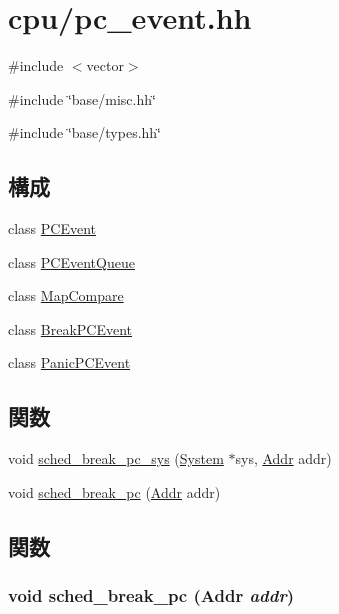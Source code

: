 \hypertarget{pc__event_8hh}{
\section{cpu/pc\_\-event.hh}
\label{pc__event_8hh}
}
{\ttfamily \#include $<$vector$>$}\par
{\ttfamily \#include \char`\"{}base/misc.hh\char`\"{}}\par
{\ttfamily \#include \char`\"{}base/types.hh\char`\"{}}\par
\subsection*{構成}
\begin{DoxyCompactItemize}
\item 
class \hyperlink{classPCEvent}{PCEvent}
\item 
class \hyperlink{classPCEventQueue}{PCEventQueue}
\item 
class \hyperlink{classPCEventQueue_1_1MapCompare}{MapCompare}
\item 
class \hyperlink{classBreakPCEvent}{BreakPCEvent}
\item 
class \hyperlink{classPanicPCEvent}{PanicPCEvent}
\end{DoxyCompactItemize}
\subsection*{関数}
\begin{DoxyCompactItemize}
\item 
void \hyperlink{pc__event_8hh_ac723c82598a63333ed963ff1788ae017}{sched\_\-break\_\-pc\_\-sys} (\hyperlink{classSystem}{System} $\ast$sys, \hyperlink{base_2types_8hh_af1bb03d6a4ee096394a6749f0a169232}{Addr} addr)
\item 
void \hyperlink{pc__event_8hh_ad8813f96321caf711dbfb3fb58097428}{sched\_\-break\_\-pc} (\hyperlink{base_2types_8hh_af1bb03d6a4ee096394a6749f0a169232}{Addr} addr)
\end{DoxyCompactItemize}


\subsection{関数}
\hypertarget{pc__event_8hh_ad8813f96321caf711dbfb3fb58097428}{
\subsubsection[{sched\_\-break\_\-pc}]{\setlength{\rightskip}{0pt plus 5cm}void sched\_\-break\_\-pc ({\bf Addr} {\em addr})}}
\label{pc__event_8hh_ad8813f96321caf711dbfb3fb58097428}



